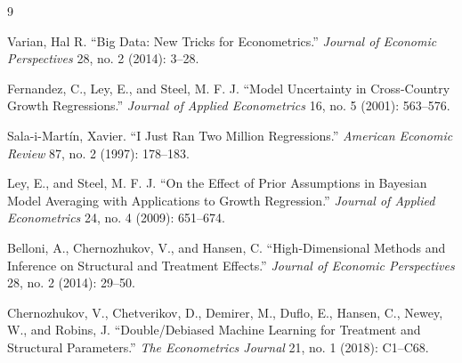 \documentclass[12pt]{article}
\begin{document}
\begin{thebibliography}{9}

Varian, Hal R. ``Big Data: New Tricks for Econometrics.''
\textit{Journal of Economic Perspectives} 28, no. 2 (2014): 3--28.

Fernandez, C., Ley, E., and Steel, M. F. J.
``Model Uncertainty in Cross-Country Growth Regressions.''
\textit{Journal of Applied Econometrics} 16, no. 5 (2001): 563--576.

Sala-i-Mart\'{i}n, Xavier.
``I Just Ran Two Million Regressions.''
\textit{American Economic Review} 87, no. 2 (1997): 178--183.

Ley, E., and Steel, M. F. J.
``On the Effect of Prior Assumptions in Bayesian Model Averaging with Applications to Growth Regression.''
\textit{Journal of Applied Econometrics} 24, no. 4 (2009): 651--674.

Belloni, A., Chernozhukov, V., and Hansen, C.
``High-Dimensional Methods and Inference on Structural and Treatment Effects.''
\textit{Journal of Economic Perspectives} 28, no. 2 (2014): 29--50.

Chernozhukov, V., Chetverikov, D., Demirer, M., Duflo, E., Hansen, C.,
Newey, W., and Robins, J.
``Double/Debiased Machine Learning for Treatment and Structural Parameters.''
\textit{The Econometrics Journal} 21, no. 1 (2018): C1--C68.

\end{thebibliography}
\end{document}
